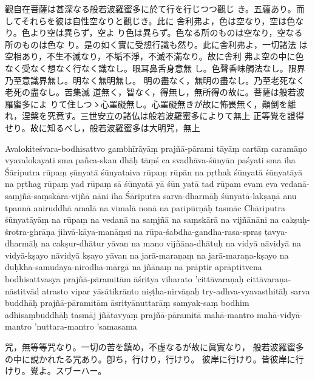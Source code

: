 \newpage

%

觀自在菩薩は甚深なる般若波羅蜜多に於て行を行じつつ觀じ
き。五蘊あり。而してそれらを彼は自性空なりと觀じき。此に
舎利弗よ，色は空なり，空は色なり。色より空は異らず，空よ
り色は異らず。色なる所のものは空なり，空なる所のものは色な
り。是の如く實に受想行識も然り。此に舎利弗よ，一切諸法
は空相あり，不生不滅なり，不垢不淨，不滅不滿なり。故に舎利
弗よ空の中に色なく受なく想なく行なく識なし。眼耳鼻舌身意無
し。色聲香味觸法なし。限界乃至意識界無し。明なく無明無し。
明の盡なく，無明の盡なし。乃至老死なく老死の盡なし。苦集滅
道無く，智なく，得無し，無所得の故に。菩薩は般若波羅蜜多によ
りて住しつゝ心罣礙無し。心罣礙無きが故に怖畏無く，顚倒を離
れ，涅槃を究竟す。三世安立の諸仏は般若波羅蜜多によりて無上
正等覺を證得せり。故に知るべし，般若波羅蜜多は大明咒，無上

\newpage
{}
Avalokiteśvara-bodhisattvo gambhīrāyāṃ prajñā-pārami\-%
tāyāṃ cartāṃ caramāṇo vyavalokayati sma \da{} pañca-skan\-%
dhāḥ \da{} tāṃś ca svadhāva-śūnyān paśyati sma iha Śāriputra
rūpaṃ ṣūnyatā śūnyataiva rūpaṃ rūpān na pṛthak śūnyatā
śūnyatāyā na pṛthag rūpaṃ yad rūpaṃ sā śūnyatā yā śūn\-%
yatā tad rūpam \da{} evam eva vedanā-saṃjñā-saṃskāra-vijñā\-%
nāni \da{} iha Śāriputra sarva-dharmāḥ śūnyatā-lakṣaṇā anu\-%
tpannā aniruddhā amalā na vimalā nonā na paripūrṇāḥ \da{}
tasmāc Chāriputra śūnyatāyāṃ na rūpaṃ na vedanā na
saṃjñā na saṃskārā na vijñānāni na cakṣuḥ-śrotra-ghrāṇa\-%
jihvā-kāya-manāṃsi \da{} na rūpa-śabdha-gandha-rasa-spraṣ\-%
ṭavya-dharmāḥ \da{} na cakṣur-dhātur yāvan na mano\-%
vijñāna-dhātuḥ na vidyā nāvidyā na vidyā-kṣayo nāvidyā\-%
kṣayo yāvan na jarā-maraṇaṃ na jarā-maraṇa-kṣayo na
duḥkha-samudaya-nirodha-mārgā na jñānaṃ na prāptir
aprāptitvena \da{} bodhisattvasya prajñā-pāramitām āśritya
viharato 'cittāvaraṇaḥ cittāvaraṇa-nāstitvād atrasto vipar\-%
yāsātikrānto niṣṭha-nirvāṇaḥ \da{} try-adhva-vyavasthitāḥ sarva\-%
buddhāḥ prajñā-pāramitām āsrityānuttarāṃ samyak-saṃ\-%
bodhim adhisaṃbuddhāḥ \da{} tasmāj jñātavyaṃ prajñā-pāramitā
mahā-mantro mahā-vidyā-mantro 'nuttara-mantro 'samasama

\newpage
咒，無等等咒なり。一切の苦を鎮め，不虚なるが故に眞實なり，
般若波羅蜜多の中に說かれたる咒あり。卽ち，行けり，行けり。
彼岸に行けり。皆彼岸に行けり。覺よ。スヷーハー。

